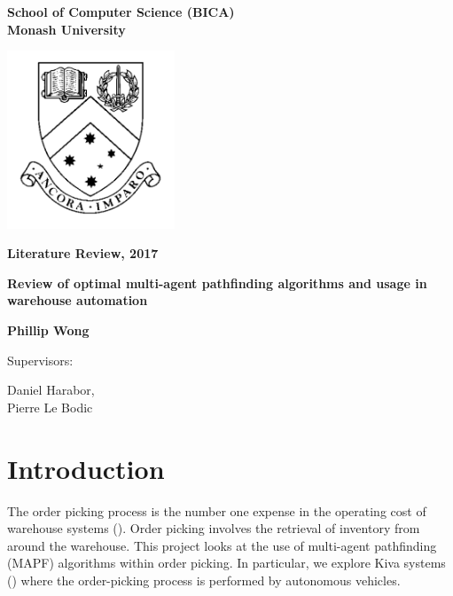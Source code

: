 \documentclass[a4paper,11pt]{article}
\begin{document}
	
\thispagestyle{empty} %
\renewcommand{\thepage}{\roman{page}}

\begin{spacing}{1.5}
	\begin{center}
		{\Large \bfseries
			School of Computer Science (BICA) \\
			Monash University}
		
		
		\vspace*{30mm}
		
		\includegraphics[width=5cm]{graphics/MonashCrest.pdf}
		
		\vspace*{15mm}
		
		{\large \bfseries
			Literature Review, 2017
		}
		
		\vspace*{10mm}
		
		{\LARGE \bfseries
			Review of optimal multi-agent pathfinding algorithms and usage in warehouse automation
		}
		
		\vspace*{20mm}
		
		{\large \bfseries
			Phillip Wong
			
			\vspace*{20mm}
			
			
			Supervisors: \parbox[t]{50mm}{Daniel Harabor,\\Pierre Le Bodic}
		}
		
	\end{center}
\end{spacing}

\newpage

\tableofcontents

\newpage
\setcounter{page}{1}
\renewcommand{\thepage}{\arabic{page}}

\section{Introduction} \label{sec:introduction}
The order picking process is the number one expense in the operating cost of warehouse systems (\cite{de2007design}). Order picking involves the retrieval of inventory from around the warehouse.
This project looks at the use of multi-agent pathfinding (MAPF) algorithms within order picking. In particular, we explore Kiva systems (\cite{wurman2008coordinating}) where the order-picking process is performed by autonomous vehicles.
\end{document}
